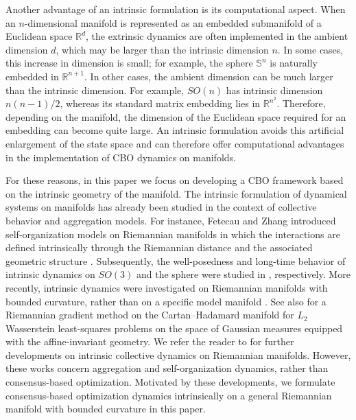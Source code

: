 \documentclass[11pt]{amsart}
\begin{document}
 Another advantage of an intrinsic formulation is its computational aspect. When an $n$-dimensional manifold is represented as an embedded submanifold of a Euclidean space $\mathbb{R}^d$, the extrinsic dynamics are often implemented in the ambient dimension $d$, which may be larger than the intrinsic dimension $n$. In some cases, this increase in dimension is small; for example, the sphere $\mathbb{S}^n$ is naturally embedded in $\mathbb{R}^{n+1}$. In other cases, the ambient dimension can be much larger than the intrinsic dimension. For example, $SO(n)$ has intrinsic dimension $n(n-1)/2$, whereas its standard matrix embedding lies in $\mathbb{R}^{n^2}$. Therefore, depending on the manifold, the dimension of the Euclidean space required for an embedding can become quite large. An intrinsic formulation avoids this artificial enlargement of the state space and can therefore offer computational advantages in the implementation of CBO dynamics on manifolds.

For these reasons, in this paper we focus on developing a CBO framework based on the intrinsic geometry of the manifold. The intrinsic formulation of dynamical systems on manifolds has already been studied in the context of collective behavior and aggregation models. For instance, Fetecau and Zhang introduced self-organization models on Riemannian manifolds in which the interactions are defined intrinsically through the Riemannian distance and the associated geometric structure \cite{FeZh2019}. Subsequently, the well-posedness and long-time behavior of intrinsic dynamics on $SO(3)$ and  the sphere were studied in \cite{FeHaPa2021,FePaPa2020}, respectively. More recently, intrinsic dynamics were investigated on Riemannian manifolds with bounded curvature, rather than on a specific model manifold \cite{FePa2023b}. See also \cite{yang2026riemannian} for a Riemannian gradient method on the Cartan--Hadamard manifold for $L_2$ Wasserstein least-squares problems on the space of Gaussian measures equipped with the affine-invariant geometry. We refer the reader to \cite{FeHaPa2021,FePa2023b,FePaPa2020,FeZh2019} for further developments on intrinsic collective dynamics on Riemannian manifolds. However, these works concern aggregation and self-organization dynamics, rather than consensus-based optimization. Motivated by these developments, we formulate consensus-based optimization dynamics intrinsically on a general Riemannian manifold with bounded curvature in this paper.
\end{document}

